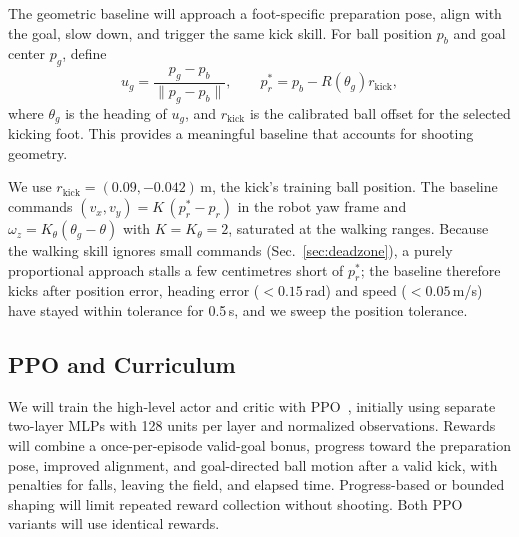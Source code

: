 \documentclass[10pt,twocolumn,letterpaper]{article}
\begin{document}
The geometric baseline will approach a foot-specific preparation pose, align with the goal, slow down, and trigger the same kick skill. For ball position $p_b$ and goal center $p_g$, define
\begin{equation}
 u_g=\frac{p_g-p_b}{\|p_g-p_b\|},\qquad
 p_r^*=p_b-R(\theta_g)r_{\mathrm{kick}},
\end{equation}
where $\theta_g$ is the heading of $u_g$, and $r_{\mathrm{kick}}$ is the calibrated ball offset for the selected kicking foot. This provides a meaningful baseline that accounts for shooting geometry.

{\color{blue}We use $r_{\mathrm{kick}}=(0.09,-0.042)$\,m, the kick's training ball position. The baseline commands $(v_x,v_y)=K\,(p_r^*-p_r)$ in the robot yaw frame and $\omega_z=K_\theta(\theta_g-\theta)$ with $K=K_\theta=2$, saturated at the walking ranges. Because the walking skill ignores small commands (Sec.~\ref{sec:deadzone}), a purely proportional approach stalls a few centimetres short of $p_r^*$; the baseline therefore kicks after position error, heading error ($<0.15$\,rad) and speed ($<0.05$\,m/s) have stayed within tolerance for 0.5\,s, and we sweep the position tolerance.\par}

\subsection{PPO and Curriculum}
We will train the high-level actor and critic with PPO~\cite{ppo}, initially using separate two-layer MLPs with 128 units per layer and normalized observations. Rewards will combine a once-per-episode valid-goal bonus, progress toward the preparation pose, improved alignment, and goal-directed ball motion after a valid kick, with penalties for falls, leaving the field, and elapsed time. Progress-based or bounded shaping will limit repeated reward collection without shooting. Both PPO variants will use identical rewards.
\end{document}
